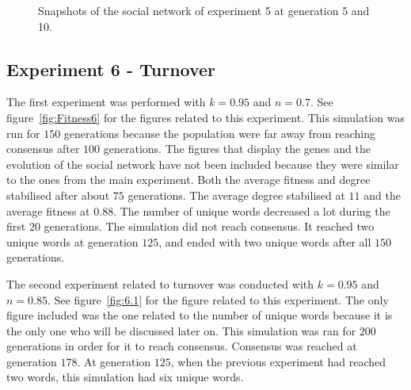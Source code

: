 \begin{figure}
    \centering
    \hfill
    \caption{Snapshots of the social network of experiment 5 at generation 5 and 10.}
    \label{fig:SN5}
\end{figure}

\subsection{Experiment 6 - Turnover}
The first experiment was performed with $k = 0.95$ and $n = 0.7$. See figure~\ref{fig:Fitness6} for the figures related to this experiment. This simulation was run for $150$ generations because the population were far away from reaching consensus after $100$ generations. The figures that display the genes and the evolution of the social network have not been included because they were similar to the ones from the main experiment. Both the average fitness and degree stabilised after about $75$ generations. The average degree stabilised at $11$ and the average fitness at $0.88$. The number of unique words decreased a lot during the first $20$ generations. The simulation did not reach consensus. It reached two unique words at generation $125$, and ended with two unique words after all $150$ generations.   

The second experiment related to turnover was conducted with $k = 0.95$ and $n = 0.85$. See figure~\ref{fig:6.1} for the figure related to this experiment. The only figure included was the one related to the number of unique words because it is the only one who will be discussed later on. This simulation was ran for $200$ generations in order for it to reach consensus. Consensus was reached at generation $178$. At generation $125$, when the previous experiment had reached two words, this simulation had six unique words. 

